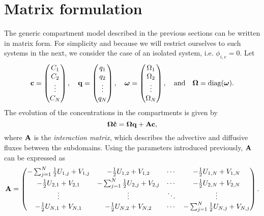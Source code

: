 \section{Matrix formulation}
The generic compartment model described in the previous sections can be written in matrix form. For simplicity and because we will restrict ourselves to such systems in the next, we consider the case of an isolated system, i.e. $\phi_{i,e} = 0$. Let
\begin{equation} \label{eq:def_compartment_vars}
	\mathbf c = \begin{pmatrix} C_1 \\ C_2 \\ \vdots \\ C_N \end{pmatrix}, \quad \mathbf q = \begin{pmatrix} q_1 \\ q_2 \\ \vdots \\ q_N \end{pmatrix}, \quad \boldsymbol \omega = \begin{pmatrix} \Omega_1 \\ \Omega_2 \\ \vdots \\ \Omega_N \end{pmatrix}, \quad \mbox{and} \quad \boldsymbol \Omega = \operatorname{diag}(\boldsymbol \omega).
\end{equation}
The evolution of the concentrations in the compartments is given by
\begin{equation} \label{eq:compartmentmatrix}
	\boldsymbol \Omega \mathbf{\dot{c}} = \boldsymbol \Omega \mathbf q + \mathbf A \mathbf c,
\end{equation}
where $\mathbf A$ is the \textit{interaction matrix}, which describes the advective and diffusive fluxes between the subdomains. Using the parameters introduced previously, $\mathbf A$ can be expressed as
\begin{equation} \label{eq:generalA}
	\mathbf A = 	\begin{pmatrix}
				-\sum_{j=1}^N \frac{1}{2}U_{1,j}+V_{1,j} & -\frac{1}{2}U_{1,2}+V_{1,2} & \cdots & -\frac{1}{2}U_{1,N}+V_{1,N}\\[.1cm]
				-\frac{1}{2}U_{2,1}+V_{2,1} & -\sum_{j=1}^N \frac{1}{2}U_{2,j}+V_{2,j} & \cdots & -\frac{1}{2}U_{2,N}+V_{2,N}\\
				\vdots & \vdots & \ddots & \vdots\\
				-\frac{1}{2}U_{N,1}+V_{N,1} & -\frac{1}{2}U_{N,2}+V_{N,2} & \cdots & -\sum_{j=1}^N \frac{1}{2}U_{N,j}+V_{N,j}
			\end{pmatrix}.
\end{equation}
